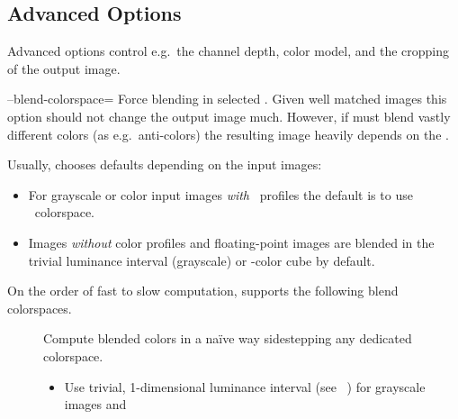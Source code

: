 

\subsection[Advanced Options\commonpart]{\label{sec:advanced-options}%
  Advanced Options\commonpart}

Advanced options control e.g.\ the channel depth, color model, and the cropping of the output
image.

\begin{codelist}
  \label{opt:blend-colorspace}%
\item[--blend-colorspace=\metavar{COLORSPACE}]\itemend
  Force blending in selected .  Given well matched images this option should
  not change the output image much.  However, if \App{} must blend vastly different colors (as
  e.g.\ anti-colors) the resulting image heavily depends on the .

  Usually, \App{} chooses defaults depending on the input images:

  \begin{itemize}
  \item
    For grayscale or color input images \emph{with} ~profiles the default is to use
    ~colorspace.

  \item
    Images \emph{without} color profiles and floating-point images are blended in the trivial
    luminance interval (grayscale) or -color cube by default.
  \end{itemize}

  On the order of fast to slow computation, \App{} supports the following blend colorspaces.

  \begin{description}
  \item[]\itemend
    Compute blended colors in a na\"ive way sidestepping any dedicated colorspace.
    \begin{itemize}
    \item
      Use trivial, 1-dimensional luminance interval (see
      \equationabbr~) for grayscale images and


\end{itemize}
\end{description}
\end{codelist}
